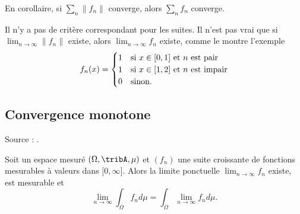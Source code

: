 En corollaire, si \( \sum_n\| f_n \|\) converge, alors \( \sum_nf_n\) converge.

\begin{remark}
    Il n'y a pas de critère correspondant pour les suites. Il n'est pas vrai que si \( \lim_{n\to \infty}\| f_n \| \) existe, alors \( \lim_{n\to \infty} f_n\) existe, comme le montre l'exemple
    \begin{equation}
        f_n(x)=\begin{cases}
            1    &   \text{si \( x\in\mathopen[ 0 , 1 \mathclose]\) et \( n\) est pair}\\
            1    &    \text{si \( x\in\mathopen[ 1 , 2 \mathclose]\) et \( n\) est impair}\\
             0   &    \text{sinon.}
        \end{cases}
    \end{equation}
\end{remark}

\subsection{Convergence monotone}

Source : \cite{mathmecaChoi}.

\begin{theorem} \label{ThoConvMonFtBoVh}
    Soit un espace mesuré \( (\Omega,\tribA,\mu)\) et \( (f_n)\) une suite croissante de fonctions mesurables à valeurs dans \( \mathopen[ 0 , \infty \mathclose]\). Alors la limite ponctuelle \( \lim_{n\to \infty} f_n\) existe, est mesurable et
    \begin{equation}
        \lim_{n\to \infty} \int_{\Omega}f_nd\mu= \int_{\Omega}\lim_{n\to \infty} f_nd\mu.
    \end{equation}
\end{theorem}

